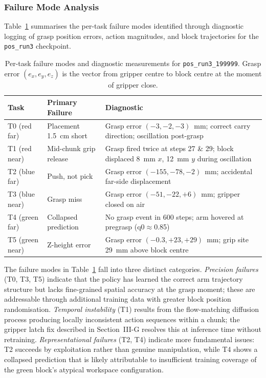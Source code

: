 \subsubsection{Failure Mode Analysis}

Table~\ref{tab:failures} summarises the per-task failure modes identified
through diagnostic logging of grasp position errors, action magnitudes,
and block trajectories for the \texttt{pos\_run3} checkpoint.

\begin{table}[t]
\centering
\caption{Per-task failure modes and diagnostic measurements for
\texttt{pos\_run3\_199999}.
Grasp error $(e_x, e_y, e_z)$ is the vector from gripper centre to
block centre at the moment of gripper close.}
\label{tab:failures}
\small
\begin{tabular}{@{}llp{3.8cm}@{}}
\toprule
\textbf{Task} & \textbf{Primary Failure} & \textbf{Diagnostic} \\
\midrule
T0 (red far)  & Placement 1.5~cm short   & Grasp error $(-3,-2,-3)$~mm; correct carry direction; oscillation post-grasp \\
T1 (red near) & Mid-chunk grip release   & Grasp fired twice at steps 27 \& 29; block displaced 8~mm $x$, 12~mm $y$ during oscillation \\
T2 (blue far) & Push, not pick           & Grasp error $(-155,-78,-2)$~mm; accidental far-side displacement \\
T3 (blue near)& Grasp miss               & Grasp error $(-51,-22,+6)$~mm; gripper closed on air \\
T4 (green far)& Collapsed prediction     & No grasp event in 600 steps; arm hovered at pregrasp (q0$\approx$0.85) \\
T5 (green near)& Z-height error          & Grasp error $(-0.3,+23,+29)$~mm; grip site 29~mm above block centre \\
\bottomrule
\end{tabular}
\end{table}

The failure modes in Table~\ref{tab:failures} fall into three distinct
categories.
\emph{Precision failures} (T0, T3, T5) indicate that the policy has learned
the correct arm trajectory structure but lacks fine-grained spatial accuracy
at the grasp moment; these are addressable through additional training data
with greater block position randomisation.
\emph{Temporal instability} (T1) results from the flow-matching diffusion
process producing locally inconsistent action sequences within a chunk;
the gripper latch fix described in Section~III-G resolves this at inference
time without retraining.
\emph{Representational failures} (T2, T4) indicate more fundamental issues:
T2 succeeds by exploitation rather than genuine manipulation, while T4 shows
a collapsed prediction that is likely attributable to insufficient training
coverage of the green block's atypical workspace configuration.

